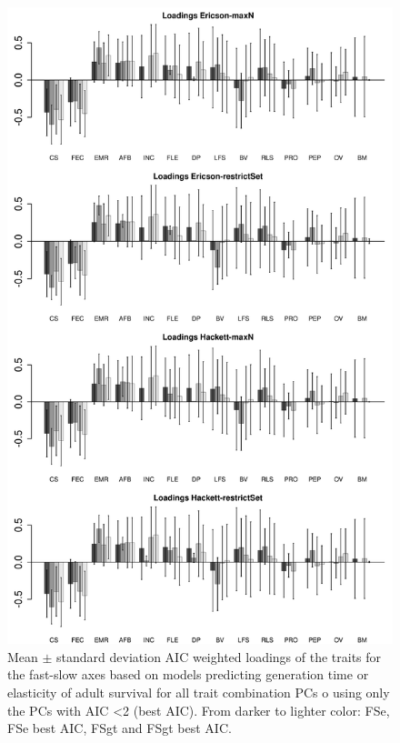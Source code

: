 \begin{figure}[ht!]
\centering
\includegraphics[width=.8\textwidth]{./Figures/Appendix2_1/FS loadings plots-ALL.png}
\caption[LHT loadings of the FS axes]{
Mean $\pm$ standard deviation AIC weighted loadings of the traits for the
fast-slow axes based on models predicting generation time or elasticity of
adult survival for all trait combination PCs o using only the PCs with AIC
\textless{2} (best AIC). From darker to lighter color: FSe, FSe best AIC, FSgt
and FSgt best AIC.}
\label{fig:figApp2.1}
\end{figure}

